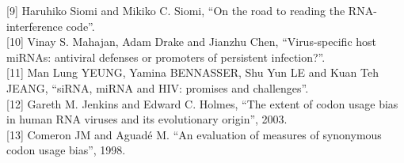\documentclass[12pt,a4paper]{article}
\begin{document}
[9] Haruhiko Siomi and Mikiko C. Siomi, “On the road to reading the RNA-interference code”. \\

[10] Vinay S. Mahajan, Adam Drake and Jianzhu Chen, “Virus-specific host miRNAs: antiviral defenses or promoters of persistent infection?”. \\

[11] Man Lung YEUNG, Yamina BENNASSER, Shu Yun LE and Kuan Teh JEANG, “siRNA, miRNA and HIV: promises and challenges”. \\

[12] Gareth M. Jenkins and Edward C. Holmes, “The extent of codon usage bias in human RNA viruses and its evolutionary origin”, 2003. \\

[13] Comeron JM and Aguadé M. “An evaluation of measures of synonymous codon usage bias”, 1998. \\
\end{document}
